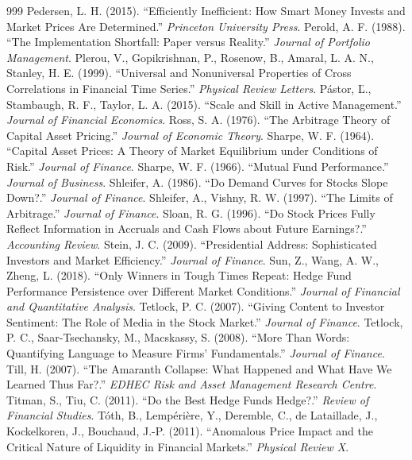 \begin{thebibliography}{999}
 Pedersen, L. H. (2015). ``Efficiently Inefficient: How Smart Money Invests and Market Prices Are Determined.'' \textit{Princeton University Press}.
 Perold, A. F. (1988). ``The Implementation Shortfall: Paper versus Reality.'' \textit{Journal of Portfolio Management}.
 Plerou, V., Gopikrishnan, P., Rosenow, B., Amaral, L. A. N., Stanley, H. E. (1999). ``Universal and Nonuniversal Properties of Cross Correlations in Financial Time Series.'' \textit{Physical Review Letters}.
 Pástor, Ľ., Stambaugh, R. F., Taylor, L. A. (2015). ``Scale and Skill in Active Management.'' \textit{Journal of Financial Economics}.
 Ross, S. A. (1976). ``The Arbitrage Theory of Capital Asset Pricing.'' \textit{Journal of Economic Theory}.
 Sharpe, W. F. (1964). ``Capital Asset Prices: A Theory of Market Equilibrium under Conditions of Risk.'' \textit{Journal of Finance}.
 Sharpe, W. F. (1966). ``Mutual Fund Performance.'' \textit{Journal of Business}.
 Shleifer, A. (1986). ``Do Demand Curves for Stocks Slope Down?.'' \textit{Journal of Finance}.
 Shleifer, A., Vishny, R. W. (1997). ``The Limits of Arbitrage.'' \textit{Journal of Finance}.
 Sloan, R. G. (1996). ``Do Stock Prices Fully Reflect Information in Accruals and Cash Flows about Future Earnings?.'' \textit{Accounting Review}.
 Stein, J. C. (2009). ``Presidential Address: Sophisticated Investors and Market Efficiency.'' \textit{Journal of Finance}.
 Sun, Z., Wang, A. W., Zheng, L. (2018). ``Only Winners in Tough Times Repeat: Hedge Fund Performance Persistence over Different Market Conditions.'' \textit{Journal of Financial and Quantitative Analysis}.
 Tetlock, P. C. (2007). ``Giving Content to Investor Sentiment: The Role of Media in the Stock Market.'' \textit{Journal of Finance}.
 Tetlock, P. C., Saar-Tsechansky, M., Macskassy, S. (2008). ``More Than Words: Quantifying Language to Measure Firms' Fundamentals.'' \textit{Journal of Finance}.
 Till, H. (2007). ``The Amaranth Collapse: What Happened and What Have We Learned Thus Far?.'' \textit{EDHEC Risk and Asset Management Research Centre}.
 Titman, S., Tiu, C. (2011). ``Do the Best Hedge Funds Hedge?.'' \textit{Review of Financial Studies}.
 Tóth, B., Lempérière, Y., Deremble, C., de Lataillade, J., Kockelkoren, J., Bouchaud, J.-P. (2011). ``Anomalous Price Impact and the Critical Nature of Liquidity in Financial Markets.'' \textit{Physical Review X}.

\end{thebibliography}
